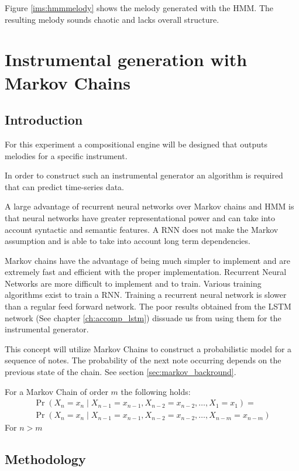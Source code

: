 Figure \ref{ims:hmmmelody} shows the melody generated with the \ac{HMM}. The resulting melody sounds chaotic and lacks overall structure.


\chapter{Instrumental generation with Markov Chains}
\section{Introduction}
For this experiment a compositional engine will be designed that outputs melodies for a specific instrument. 

In order to construct such an instrumental generator an algorithm is required that can predict time-series data.

A large advantage of recurrent neural networks over Markov chains and \ac{HMM} is that neural networks have greater representational power and can take into account syntactic and semantic features. A \ac{RNN} does not make the Markov assumption and is able to take into account long term dependencies.

Markov chains have the advantage of being much simpler to implement and are extremely fast and efficient with the proper implementation. 
Recurrent Neural Networks are more difficult to implement and to train. Various training algorithms exist to train a \ac{RNN}. Training a recurrent neural network is slower than a regular feed forward network. The poor results obtained from the \ac{LSTM} network (See chapter \ref{ch:accomp_lstm}) dissuade us from using them for the instrumental generator.

This concept will utilize Markov Chains to construct a probabilistic model for a sequence of notes. The probability of the next note occurring depends on the previous state of the chain. See section \ref{sec:markov_backround}.

For a Markov Chain of order $m$ the following holds:
\begin{align}
\Pr(X_n=x_n\mid X_{n-1}=x_{n-1}, X_{n-2}=x_{n-2}, \dots , X_1=x_1) =
\\  \Pr(X_n=x_n\mid X_{n-1}=x_{n-1}, X_{n-2}=x_{n-2}, \dots, X_{n-m}=x_{n-m})
\end{align}
For $n > m$

\section{Methodology}
